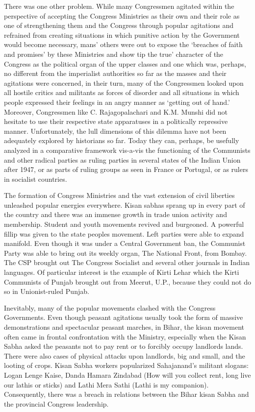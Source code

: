 \begin{multicols}{2}
There was one other problem. While many Congressmen agitated within the perspective of accepting the Congress Ministries as their own and their role as one of strengthening them and the Congress through popular agitations and refrained from creating situations in which punitive action by the Government would become necessary, mans' others were out to expose the `breaches of faith and promises' by these Ministries and show tip the true' character of the Congress as the political organ of the upper classes and one which was, perhaps, no different from the imperialist authorities so far as the masses and their agitations were concerned, in their turn, many of the Congressmen looked upon all hostile critics and militants as forces of disorder and all situations in which people expressed their feelings in an angry manner as `getting out of hand.' Moreover, Congressmen like C. Rajagopalachari and K.M. Munshi did not hesitate to use their respective state apparatuses in a politically repressive manner. Unfortunately, the lull dimensions of this dilemma have not been adequately explored by historians so far. Today they can, perhaps, be usefully analyzed in a comparative framework vis-a-vis the functioning of the Communists and other radical parties as ruling parties in several states of the Indian Union after 1947, or as parts of ruling groups as seen in France or Portugal, or as rulers in socialist countries.

The formation of Congress Ministries and the vast extension of civil liberties unleashed popular energies everywhere. Kisan sabhas sprang up in every part of the country and there was an immense growth in trade union activity and membership. Student and youth movements revived and burgeoned. A powerful fillip was given to the state peoples movement. Left parties were able to expand manifold. Even though it was under a Central Government ban, the Communist Party was able to bring out its weekly organ, The National Front, from Bombay. The CSP brought out The Congress Socialist and several other journals in Indian languages. Of particular interest is the example of Kirti Lehar which the Kirti Communists of Punjab brought out from Meerut, U.P., because they could not do so in Unionist-ruled Punjab.

Inevitably, many of the popular movements clashed with the Congress Governments. Even though peasant agitations usually took the form of massive demonstrations and spectacular peasant marches, in Bihar, the kisan movement often came in frontal confrontation with the Ministry, especially when the Kisan Sabha asked the peasants not to pay rent or to forcibly occupy landlords lands. There were also cases of physical attacks upon landlords, big and small, and the looting of crops. Kisan Sabha workers popularized Sahajanand's militant slogans: Logan Lenge Kaise, Danda Hamara Zindabad (How will you collect rent, long live our lathis or sticks) and Lathi Mera Sathi (Lathi is my companion). Consequently, there was a breach in relations between the Bihar kisan Sabha and the provincial Congress leadership.


\end{multicols}
